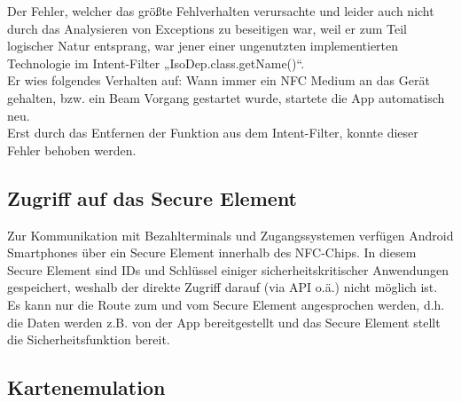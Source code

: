 \documentclass[a4paper,ngerman,12pt]{scrreprt}
\begin{document}
Der Fehler, welcher das größte Fehlverhalten verursachte und leider auch nicht durch das Analysieren von Exceptions zu beseitigen war, weil er zum Teil logischer Natur entsprang, war jener einer ungenutzten implementierten Technologie im Intent-Filter „IsoDep.class.getName()“. \\
Er wies folgendes Verhalten auf: Wann immer ein NFC Medium an das Gerät gehalten, bzw. ein Beam Vorgang gestartet wurde, startete die App automatisch neu. \\
Erst durch das Entfernen der Funktion aus dem Intent-Filter, konnte dieser Fehler behoben werden.

\subsection*{Zugriff auf das Secure Element}

Zur Kommunikation mit Bezahlterminals und Zugangssystemen verfügen Android Smartphones über ein Secure Element innerhalb des NFC-Chips. In diesem Secure Element sind IDs und Schlüssel einiger sicherheitskritischer Anwendungen gespeichert, weshalb der direkte Zugriff darauf (via API o.ä.) nicht möglich ist. \\
Es kann nur die Route zum und vom Secure Element angesprochen werden, d.h. die Daten werden z.B. von der App bereitgestellt und das Secure Element stellt die Sicherheitsfunktion bereit.

\subsection*{Kartenemulation}
\end{document}
